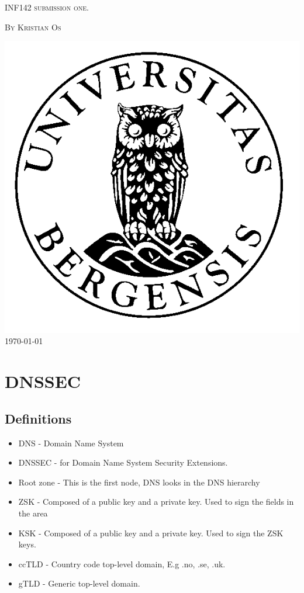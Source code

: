 \documentclass{article}
\begin{document}
	\begin{titlepage}
		\centering
		{\scshape\Large INF142 submission one.\par}
		\vspace{3em}
		{{\scshape\large By Kristian Os \par}}
        \vspace{5em}
        \includegraphics[scale=0.5]{uibLogo}
		\vfill
		\large\today
	\end{titlepage}
	\pagebreak
	\section{DNSSEC}
		\subsection{Definitions}
        \begin{itemize}
            \item DNS - Domain Name System
            \item DNSSEC - for Domain Name System Security Extensions.
            \item Root zone - This is the first node, DNS looks in the DNS hierarchy
            \item ZSK - Composed of a public key and a private key. Used to sign the fields in the area\cite{ovh}
            \item KSK - Composed of a public key and a private key. Used to sign the ZSK keys.\cite{ovh}
			\item ccTLD - Country code top-level domain, E.g .no, .se, .uk. 
            \item gTLD - Generic top-level domain.
        \end{itemize}
\end{document}
